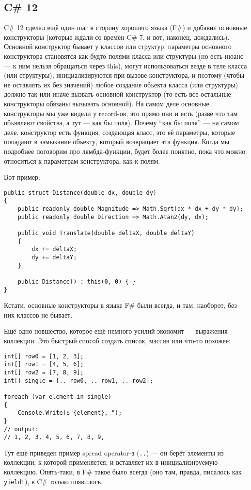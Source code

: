 \documentclass{../../text-style}
\begin{document}
\subsection{C\# 12}

C\# 12 сделал ещё один шаг в сторону хорошего языка (F\#) и добавил основные конструкторы (которые ждали со времён C\# 7, и вот, наконец, дождались). Основной конструктор бывает у классов или структур, параметры основного конструктора становятся как будто полями класса или структуры (но есть нюанс --- к ним нельзя обращаться через this), могут использоваться везде в теле класса (или структуры), инициализируются при вызове конструктора, и поэтому (чтобы не оставлять их без значений) любое создание объекта класса (или структуры) должно так или иначе вызвать основной конструктор (то есть все остальные конструкторы обязаны вызывать основной). На самом деле основные конструкторы мы уже видели у record-ов, это прямо они и есть (разве что там объявляют свойства, а тут --- как бы поля). Почему \enquote{как бы поля} --- на самом деле, конструктор есть функция, создающая класс, это её параметры, которые попадают в замыкание объекту, который возвращает эта функция. Когда мы подробнее поговорим про лямбда-функции, будет более понятно, пока что можно относиться к параметрам конструктора, как к полям.

Вот пример:

\begin{verbatim}
public struct Distance(double dx, double dy)
{
    public readonly double Magnitude => Math.Sqrt(dx * dx + dy * dy);
    public readonly double Direction => Math.Atan2(dy, dx);

    public void Translate(double deltaX, double deltaY)
    {
        dx += deltaX;
        dy += deltaY;
    }

    public Distance() : this(0, 0) { }
}
\end{verbatim}

Кстати, основные конструкторы в языке F\# были всегда, и там, наоборот, без них классов не бывает.

Ещё одно новшество, которое ещё немного усилий экономит --- выражения-коллекции. Это быстрый способ создать список, массив или что-то похожее:

\begin{verbatim}
int[] row0 = [1, 2, 3];
int[] row1 = [4, 5, 6];
int[] row2 = [7, 8, 9];
int[] single = [.. row0, .. row1, .. row2];

foreach (var element in single)
{
    Console.Write($"{element}, ");
}
// output:
// 1, 2, 3, 4, 5, 6, 7, 8, 9,
\end{verbatim}

Тут ещё приведён пример spread operator-а (\verb|..|) --- он берёт элементы из коллекции, к которой применяется, и вставляет их в инициализируемую коллекцию. Опять-таки, в F\# такое было всегда (оно там, правда, писалось как \verb|yield!|), в C\# только появилось.
\end{document}
